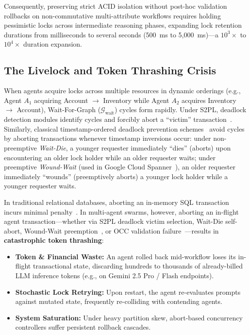 \documentclass[conference,10pt]{IEEEtran}
\begin{document}
Consequently, preserving strict ACID isolation without post-hoc validation rollbacks on non-commutative multi-attribute workflows requires holding pessimistic locks across intermediate reasoning phases, expanding lock retention durations from milliseconds to several seconds (500~ms to 5,000~ms)---a $10^3\times$ to $10^4\times$ duration expansion.

\subsection{The Livelock and Token Thrashing Crisis}
When agents acquire locks across multiple resources in dynamic orderings (e.g., Agent $A_1$ acquiring Account $\to$ Inventory while Agent $A_2$ acquires Inventory $\to$ Account), Wait-For-Graph ($\mathcal{G}_{\text{wait}}$) cycles form rapidly. Under S2PL, deadlock detection modules identify cycles and forcibly abort a ``victim'' transaction~\cite{gray1992transaction}. Similarly, classical timestamp-ordered deadlock prevention schemes~\cite{rosenkrantz1978system, harding2017evaluation} avoid cycles by aborting transactions whenever timestamp inversions occur: under non-preemptive \textit{Wait-Die}, a younger requester immediately ``dies'' (aborts) upon encountering an older lock holder while an older requester waits; under preemptive \textit{Wound-Wait} (used in Google Cloud Spanner~\cite{corbett2013spanner}), an older requester immediately ``wounds'' (preemptively aborts) a younger lock holder while a younger requester waits.

In traditional relational databases, aborting an in-memory SQL transaction incurs minimal penalty~\cite{harding2017evaluation}. In multi-agent swarms, however, aborting an in-flight agent transaction---whether via S2PL deadlock victim selection, Wait-Die self-abort, Wound-Wait preemption~\cite{rosenkrantz1978system}, or OCC validation failure~\cite{kung1981optimistic}---results in \textbf{catastrophic token thrashing}:
\begin{itemize}
    \item \textbf{Token \& Financial Waste:} An agent rolled back mid-workflow loses its in-flight transactional state, discarding hundreds to thousands of already-billed LLM inference tokens (e.g., on Gemini 2.5 Pro / Flash endpoints).
    \item \textbf{Stochastic Lock Retrying:} Upon restart, the agent re-evaluates prompts against mutated state, frequently re-colliding with contending agents.
    \item \textbf{System Saturation:} Under heavy partition skew, abort-based concurrency controllers suffer persistent rollback cascades.
\end{itemize}
\end{document}
